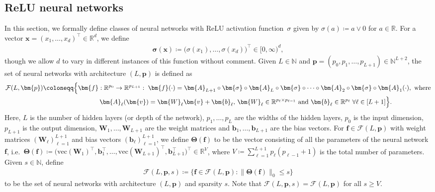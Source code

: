 \documentclass[12pt]{article}
\begin{document}
\subsection{ReLU neural networks} \label{sec:ReLU-NN}
In this section, we formally define classes of neural networks with ReLU activation function~$\sigma$ given by $\sigma(a) \coloneqq a\vee 0$ for $a\in\mathbb{R}$.  For a vector $\bm{x}=(x_1,\ldots,x_d)^\top\in\mathbb{R}^d$, we define
\begin{align*}
    \bm{\sigma}(\bm{x}) \coloneqq \bigl(\sigma(x_1),\ldots,\sigma(x_d)\bigr)^\top \in [0,\infty)^d,
\end{align*}
though we allow $d$ to vary in different instances of this function without comment.  Given $L\in\mathbb{N}$ and $\bm{p} = (p_0,p_1,\ldots,p_{L+1}) \in \mathbb{N}^{L+2}$, the set of neural networks with architecture $(L,\bm{p})$ is defined as
\begin{align}
    \mathcal{F}(L,\bm{p}) \coloneqq &\Bigl\{ \bm{f}:\mathbb{R}^{p_0} \to \mathbb{R}^{p_{L+1}} :\; \bm{f}(\cdot) = \bm{A}_{L+1} \circ \bm{\sigma} \circ \bm{A}_L \circ \bm{\sigma} \circ \cdots \circ \bm{A}_2 \circ \bm{\sigma} \circ \bm{A}_1(\cdot),\text{ where}\nonumber\\
    & \qquad\qquad \bm{A}_\ell(\bm{v}) = \bm{W}_\ell \bm{v} + \bm{b}_\ell,\, \bm{W}_\ell \in \mathbb{R}^{p_{\ell} \times p_{\ell-1}} \text{ and } \bm{b}_{\ell} \in\mathbb{R}^{p_{\ell}} \;\forall \ell\in[L+1] \Bigr\}. \label{Eq:Flp}
\end{align}
Here, $L$ is the number of hidden layers (or depth of the network), $p_1,\ldots,p_L$ are the widths of the hidden layers, $p_0$ is the input dimension, $p_{L+1}$ is the output dimension, $\bm{W}_1,\ldots,\bm{W}_{L+1}$ are the weight matrices and $\bm{b}_1,\ldots,\bm{b}_{L+1}$ are the bias vectors. For $\bm{f}\in\mathcal{F}(L,\bm{p})$ with weight matrices $(\bm{W}_{\ell})_{\ell=1}^{L+1}$ and bias vectors $(\bm{b}_{\ell})_{\ell=1}^{L+1}$, we define $\bm{\Theta}(\bm{f})$ to be the vector consisting of all the parameters of the neural network $\bm f$, i.e.\ $\bm{\Theta}(\bm{f}) \coloneqq \bigl(\mathrm{vec}(\bm{W}_1)^\top, \bm{b}_1^\top, \ldots,\mathrm{vec}(\bm{W}_{L+1})^\top, \bm{b}_{L+1}^\top\bigr)^\top \in \mathbb{R}^{V}$, where $V \coloneqq \sum_{\ell=1}^{L+1} p_\ell(p_{\ell-1}+1)$ is the total number of parameters. Given $s\in\mathbb{N}$, define
\begin{align*}
    \mathcal{F}(L,\bm{p},s) \coloneqq \bigl\{ \bm{f}\in\mathcal{F}(L,\bm{p}) : \|\bm{\Theta}(\bm{f})\|_0 \leq s \bigr\}
\end{align*}
to be the set of neural networks with architecture $(L,\bm{p})$ and sparsity $s$. Note that $\mathcal{F}(L,\bm p, s) = \mathcal{F}(L,\bm p)$ for all $s\geq V$.
\end{document}
